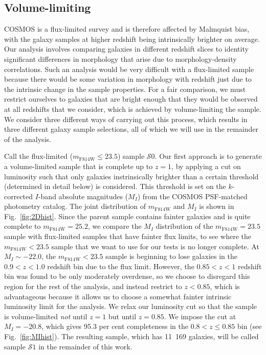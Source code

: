 \documentclass[twocolumn,useAMS,usenatbib]{mn2e}
\newcommand{\rachel}[1]{{\textcolor{red}{#1}}}
\newcommand{\s}{\ensuremath{\mathcal{S}}}
\begin{document}
\subsection{Volume-limiting}
\label{sub:volumelimiting}
 
COSMOS is a flux-limited survey and is therefore affected by Malmquist
bias, with the galaxy samples at higher redshift being intrinsically
brighter on average.  
Our analysis involves comparing galaxies in different redshift slices
to identity significant differences in morphology that arise due to
morphology-density correlations.  Such an analysis would be very
difficult with a flux-limited sample because there would be some
variation in morphology with redshift just due to the intrinsic change
in the sample properties.  For a fair comparison, we must restrict
ourselves to galaxies that are bright enough that they would be
observed at all redshifts that we consider, which is achieved by
volume-limiting the sample.  We consider three different ways of
carrying out this process, which results in three different galaxy
sample selections, all of which we will use in the remainder of the
analysis.

Call the flux-limited ($m_\text{F814W} \le 23.5$) sample \s$0$. Our first approach is to generate a volume-limited sample that is
complete up to $z=1$, by applying a cut on luminosity such that only
galaxies instrinsically brighter than a certain threshold (determined
in detail below) is considered. This threshold is set on the
$k$-corrected $I$-band absolute magnitudes ($M_I$) from the COSMOS PSF-matched
photometry catalog.   The joint distribution of $m_\text{F814W}$ and
$M_I$ is shown in Fig.~\ref{fig:2Dhist}. 
Since the parent sample contains fainter galaxies and is quite
complete to $m_\text{F814W}=25.2$, we compare the $M_I$ distribution
of the $m_\text{F814W}=23.5$ sample with flux-limited samples that
have fainter flux limits, to see where the $m_\text{F814W}<23.5$
sample that we want to use for our tests is no longer complete.
At $M_I\sim-22.0$, the
$m_\text{F814W}<23.5$ sample is beginning to lose galaxies in the
$0.9<z<1.0$ redshift bin due to the flux limit. However, the $0.85<z<1$
redshift bin was found to be only moderately overdense, so we choose
to disregard this region for the rest of the analysis, and instead
restrict to $z<0.85$, which is advantageous because it allows us to
choose a somewhat fainter intrinsic luminosity limit for the
analysis.  We relax our luminosity cut %
so that the sample is volume-limited \emph{not} until $z=1$ but until $z=0.85$. 
We impose the cut at $M_I=-20.8$, which gives 95.3 per cent completeness in
the $0.8 < z \le 0.85$ bin (see Fig.~\ref{fig:MIhist}). The resulting
sample, which has 11~169 galaxies, will be called sample \s$1$ in the remainder
of this work.
\end{document}
